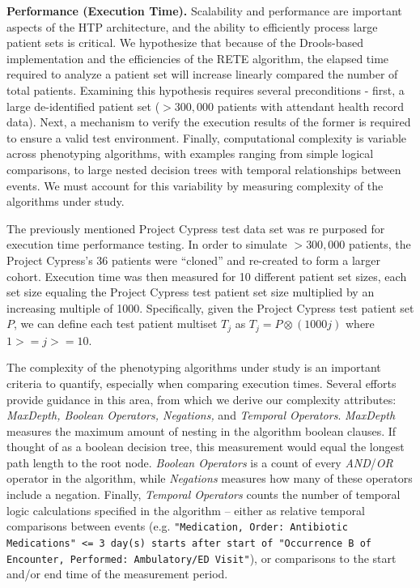 \documentclass{amia}
\begin{document}
\textbf{Performance (Execution Time).}
Scalability and performance are important aspects of the HTP architecture, and the ability to efficiently process large patient sets is critical. We hypothesize that because of the Drools-based implementation and the efficiencies of the RETE algorithm, the elapsed time required to analyze a patient set will increase linearly compared the number of total patients. Examining this hypothesis requires several preconditions - first, a large de-identified patient set ($> 300,000$ patients with attendant health record data). Next, a mechanism to verify the execution results of the former is required to ensure a valid test environment. Finally, computational complexity is variable across phenotyping algorithms, with examples ranging from simple logical comparisons, to large nested decision trees with temporal relationships between events. We must account for this variability by measuring complexity of the algorithms under study.

The previously mentioned Project Cypress test data set was re purposed for execution time performance testing. In order to simulate $> 300,000$ patients, the Project Cypress's 36 patients were ``cloned'' and re-created to form a larger cohort. Execution time was then measured for 10 different patient set sizes, each set size equaling the Project Cypress test patient set size multiplied by an increasing multiple of 1000. Specifically, given the Project Cypress test patient set $P$, we can define each test patient multiset $T_j$ as $T_j = P \otimes (1000j)$ where $1 >= j >=10$.

The complexity of the phenotyping algorithms under study is an important criteria to quantify, especially when comparing execution times. Several efforts provide guidance in this area\cite{li2012modeling,ross2010analysis}, from which we derive our complexity attributes: \textit{MaxDepth,  Boolean Operators, Negations,} and \textit{Temporal Operators}. \textit{MaxDepth} measures the maximum amount of nesting in the algorithm boolean clauses. If thought of as a boolean decision tree, this measurement would equal the longest path length to the root node. \textit{Boolean Operators} is a count of every \textit{AND}/\textit{OR} operator in the algorithm, while \textit{Negations} measures how many of these operators include a negation. Finally, \textit{Temporal Operators} counts the number of temporal logic calculations specified in the algorithm -- either as relative temporal comparisons between events (e.g. \texttt{"Medication, Order: Antibiotic Medications" <= 3 day(s) starts after start of "Occurrence B of Encounter, Performed: Ambulatory/ED Visit"}), or comparisons to the start and/or end time of the measurement period.
\end{document}
